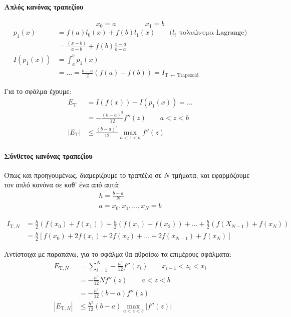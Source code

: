 \documentclass[11pt,a4paper,notitlepage,fleqn]{article}
\begin{document}
    \paragraph{Απλός κανόνας τραπεζίου}
    
    \[x_0 = a \hspace{50pt} x_1=b \]
    \begin{align*}
    	p_1(x) &= f(a)l_0(x) + f(b)l_1(x) \qquad
    	\text{($l_i$ πολυώνυμα Lagrange)} \\
    	&= \frac{(x-b)}{a-b} + f(b)\frac{x-a}{b-a} \\
    	I\left(p_1(x)\right) &= \int_{a}^{b} p_1(x)
    	\\ &= \dots = \frac{b-a}{2}\left(f(a)-f(b)\right) =
    	I_{\mathrm T \ \leftarrow \text{Trapezoid}}
    \end{align*}

    Για το σφάλμα έχουμε:
    \begin{align*}
    	E_{\mathrm T} &= I\left(f(x)\right) - I\left(p_1(x)\right)
    	= \dots \\ &=
    	-\frac{(b-a)^3}{12}f''(z) \qquad a<z<b \\
    	\left|E_{\mathrm T}\right| &\leq \frac{(b-a)^3}{12}
    	\max_{a<z<b} f''(z)
    \end{align*}
    
    \paragraph{Σύνθετος κανόνας τραπεζίου}
    Όπως και προηγουμένως, διαμερίζουμε το τραπέζιο σε \( N \) τμήματα,
    και εφαρμόζουμε τον απλό κανόνα σε καθ' ένα από αυτά:
    \begin{gather*}
    	h = \frac{b-a}{N} \\
    	a = x_0,x_1,\dots,x_N=b
    \end{gather*}
    
    \begin{align*}
    	I_{\mathrm T,N} &= \frac{h}{2} \left(f(x_0)+f(x_1)\right)
    	+ \frac{h}{2} \left(f(x_1)+f(x_2)\right) + \dots + \frac{h}{2}
    	\left(f(X_{N-1})+f(x_N)\right)
    	\\ &= \frac{h}{2} \left[
    	f(x_0)+2f(x_1)+2f(x_2)+\dots+2f(x_{N-1})+f(x_N)
    	\right]
    \end{align*}
    
    Αντίστοιχα με παραπάνω, για το σφάλμα θα αθροίσω τα επιμέρους
    σφάλματα:
    \begin{align*}
    	E_{\mathrm T,N} &= \sum_{i=1}^{N} -\frac{h^3}{12} f''(z_i)
    	\qquad x_{i-1} < z_i < x_i
    	\\ &= - \frac{h^3}{12} N f''(z) \qquad a<z<b
    	\\ &= -\frac{h^2}{12}(b-a)f''(z) \\
    	|E_{\mathrm T,N}| &\leq \frac{h^2}{12}(b-a)\max_{a<z<b}
    	\left|f''(z)\right|
    \end{align*}
    
\end{document}
